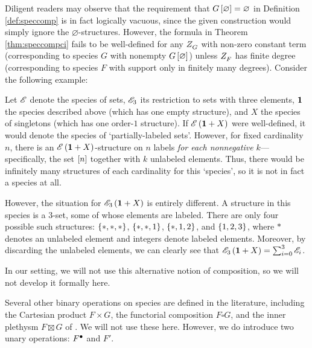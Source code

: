 \documentclass[distribution,draft]{brandiss} %
\numberwithin{section}{chapter}
\numberwithin{figure}{chapter}
\begin{document}
Diligent readers may observe that the requirement that $G \left[ {\varnothing} \right] = \varnothing$ in Definition \ref{def:speccomp} is in fact logically vacuous, since the given construction would simply ignore the $\varnothing$-structures.
However, the formula in Theorem \ref{thm:speccompci} fails to be well-defined for any $ Z_{G}^{} $ with non-zero constant term (corresponding to species $G$ with nonempty $G \left[ {\varnothing} \right]$) unless $ Z_{F}^{} $ has finite degree (corresponding to species $F$ with support only in finitely many degrees).
Consider the following example:
\begin{example}
  Let $\mathscr{E}$ denote the species of sets, $\mathscr{E}_{3}$ its restriction to sets with three elements, $\mathbf{1}$ the species described above (which has one empty structure), and $X$ the species of singletons (which has one order-$1$ structure).
  If $\mathscr{E} \left( {\mathbf{1} + X} \right)$ were well-defined, it would denote the species of `partially-labeled sets'.
  However, for fixed cardinality $n$, there is an $\mathscr{E} \left( {\mathbf{1} + X} \right)$-structure on $n$ labels \emph{for each nonnegative $k$}---specifically, the set $\left[ {n} \right]$ together with $k$ unlabeled elements.
  Thus, there would be infinitely many structures of each cardinality for this `species', so it is not in fact a species at all.

  However, the situation for $\mathscr{E}_{3} \left( {\mathbf{1} + X} \right)$ is entirely different.
  A structure in this species is a $3$-set, some of whose elements are labeled.
  There are only four possible such structures: $\left\{ {*, *, *} \right\}$, $\left\{ {*, *, 1} \right\}$, $\left\{ {*, 1, 2} \right\}$, and $\left\{ {1, 2, 3} \right\}$, where $*$ denotes an unlabeled element and integers denote labeled elements.
  Moreover, by discarding the unlabeled elements, we can clearly see that $\mathscr{E}_{3} \left( {\mathbf{1} + X} \right) = \sum_{i = 0}^{3} \mathscr{E}_{i}$.
\end{example}
In our setting, we will not use this alternative notion of composition, so we will not develop it formally here.

Several other binary operations on species are defined in the literature, including the Cartesian product $F \times G$, the functorial composition $F \square G$, and the inner plethysm $F \boxtimes G$ of \cite{travis:inpleth}.
We will not use these here.
However, we do introduce two unary operations: $ {F}^{\bullet } $ and $F'$.
\end{document}
